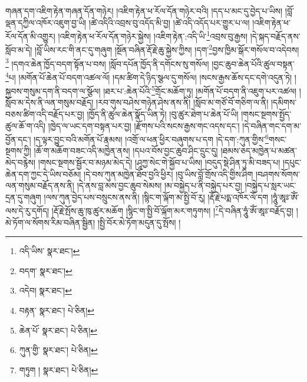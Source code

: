 གཞན་དག་འཇིག་རྟེན་གཞན་དོན་གཉེར། །འཇིག་རྟེན་ཕ་རོལ་དོན་གཉེར་བའི། །དད་པ་མང་དུ་བྱེད་པ་ཡིས། །བློ་ལྡན་དཀྱིལ་འཁོར་འཇུག་བྱ་ཡི། །ཚེ་འདིའི་འབྲས་བུ་འདོད་མི་བྱ། །ཚེ་འདི་འདོད་པར་གྱུར་པ་ལ། །འཇིག་རྟེན་ཕ་རོལ་དོན་མི་འགྱུར། །འཇིག་རྟེན་ཕ་རོལ་དོན་གཉེར་སྐྱེས། །འཇིག་རྟེན་:འདི་ཡི་\footnote{འདི་ཡིས་  སྣར་ཐང་། }འབྲས་བུ་རྒྱས། །དེ་སྐད་བརྗོད་ནས་སློབ་མ་དེ། །བློ་ཡིས་རང་གི་ནང་དུ་གཞུག །སྔོན་བཞིན་རྡོ་རྗེ་ཆུ་སྐྱེས་ཀྱིས། །དག་\footnote{བདག་  སྣར་ཐང་། }བྱས་ཁྱིམ་སྒོར་གསོལ་བ་འདེབས།\footnote{འདེབ།  སྣར་ཐང་། } །དགའ་ཆེན་ཁྱོད་བདག་སྟོན་པ་བས། །སློབ་དཔོན་ཁྱོད་ནི་དགོངས་སུ་གསོལ། །བྱང་ཆུབ་ཆེན་པོའི་ཚུལ་བསྟན་\footnote{བརྟན་  སྣར་ཐང་།  པེ་ཅིན། }པ། །མགོན་པོ་ཆེན་པོ་བདག་འཚལ་ལོ། །དམ་ཚིག་དེ་ཉིད་སྩལ་དུ་གསོལ། །སངས་རྒྱས་ཆོས་དང་དགེ་འདུན་ཏེ། །སྐྱབས་གསུམ་དག་ནི་བདག་ལ་སྩོལ། །ཐར་པ་:ཆེན་པོའི་\footnote{ཆེན་པོ་  སྣར་ཐང་།  པེ་ཅིན། }གྲོང་མཆོག་ཏུ། །མགོན་པོ་བདག་ནི་འཇུག་པར་འཚལ། །སློབ་མ་དེས་ནི་ལན་གསུམ་བརྗོད། །རབ་གུས་བཤེས་གཉེན་ཤེས་ནས་ནི། །སློབ་མ་གཙོ་བོ་གཅིག་ལ་ནི། །དམིགས་བཅས་ཚིག་འདི་བརྗོད་པར་བྱ། །ཁྱོད་ནི་ཚུལ་ཆེན་སྣོད་ཡིན་ཏེ། །བུ་ཚུར་ཐེག་པ་ཆེན་པོ་ཡི། །གསང་སྔགས་སྤྱོད་ཚུལ་ཆོ་ག་འདི། །ཁྱེད་ལ་ཡང་དག་བསྟན་པར་བྱ། །རྫོགས་པའི་སངས་རྒྱས་གང་འདས་དང་། །དེ་བཞིན་གང་དག་མ་བྱོན་དང་། །ད་ལྟར་བྱུང་བའི་མགོན་པོ་རྣམས། །འགྲོ་ལ་ཕན་ཕྱིར་བཞུགས་པ་དག །དེ་དག་:ཀུན་གྱིས་\footnote{ཀུན་གྱི་  སྣར་ཐང་།  པེ་ཅིན། }གསང་སྔགས་ཀྱི། །ཆོ་ག་མཆོག་བཟང་འདི་མཁྱེན་ནས། །དཔའ་བོས་བྱང་ཆུབ་ཤིང་དྲུང་དུ། །ཐམས་ཅད་མཁྱེན་པ་མཚན་མེད་བརྙེས། །གསང་སྔགས་སྦྱོར་བ་མཉམ་མེད་དེ། །ཤཱཀྱ་སེང་གེ་སྐྱོབ་པ་ཡིས། །བདུད་སྡེ་ཤིན་ཏུ་མི་བཟད་པ། །དཔུང་ཆེན་དག་ཀྱང་དེ་ཡིས་བཅོམ། །དེ་བས་ཀུན་མཁྱེན་ཐོབ་བྱའི་ཕྱིར། །བུ་ཡིས་བློ་གྲོས་འདི་གྱིས་ཤིག །བཤགས་སོགས་ལན་གསུམ་བརྗོད་ནས་ནི། །དེ་ནས་བླ་མས་བྱང་ཆུབ་སེམས། །མ་བསྐྱེད་པ་ནི་བསྐྱེད་པར་བྱ། །བསྐྱེད་པ་སླར་ཡང་དྲན་དུ་གཞུག །ལས་ཀུན་བྱེད་པས་བསྲུངས་ནས་ནི། །སྙིང་ག་ལྐོག་མ་སྤྱི་བོ་རུ། །རྡོ་རྗེ་པདྨ་འཁོར་ལོ་དག །ཧཱུཾ་ཨཱཿ་ཨོཾ་ལས་དེ་རུ་དགོད། །རྡོ་རྗེ་སྤོས་ཆུ་ཁུ་ཚུར་མཆོག །སྙིང་ག་སྤྱི་བོ་ལྐོག་མར་གཏུགས། །\footnote{གཏུག །  སྣར་ཐང་།  པེ་ཅིན། }དེ་བཞིན་ཧཱུཾ་ཨོཾ་ཨཱཿ་བརྗོད་བྱ། །མེ་ཏོག་ལ་སོགས་རིམ་བཞིན་སྦྱིན། །སྤྱི་བོར་མེ་ཏོག་མདུན་དུ་སྤོས། །
